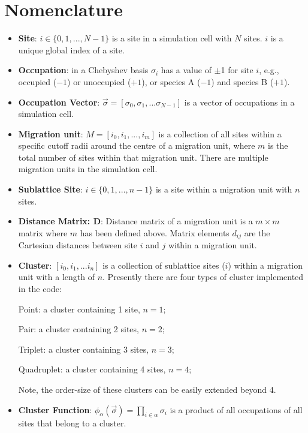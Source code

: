 \documentclass[a4paper,fleqn]{cas-dc}
\begin{document}
\section{Nomenclature}\label{sec:nomenclature}
\begin{itemize}
    \item \textbf{Site}: $i \in \{0,1,...,N-1\}$ is a site in a simulation cell with $N$ sites. $i$ is a unique global index of a site.

    \item \textbf{Occupation}: in a Chebyshev basis $\sigma_i$ has a value of $\pm$1  for site $i$, e.g., occupied ($-1$) or unoccupied ($+1$), or species A ($-1$) and species B ($+1$).

    \item \textbf{Occupation Vector}: $\vec{\sigma}=[ \sigma_0,\sigma_1,...\sigma_{N-1}]$ is a vector of occupations in a simulation cell.
    
    \item \textbf{Migration unit}: $M=[i_0,i_1,...,i_m]$ is a collection of all sites within a specific cutoff radii around the centre of a migration unit, where $m$ is the total number of sites within that migration unit. There are multiple migration units in the simulation cell.
    
    \item \textbf{Sublattice Site}: $i \in \{0,1,...,n-1\}$ is a site within a migration unit with $n$ sites.

    \item \textbf{Distance Matrix: D}: Distance matrix of a migration unit is a $m\times m$ matrix where $m$ has been defined above. Matrix elements $d_{ij}$ are the Cartesian distances between site $i$ and $j$ within a migration unit.

    \item \textbf{Cluster}: $[i_0,i_1,...i_{n}]$ is a collection of sublattice sites ($i$) within a migration unit with a length of $n$. Presently there are four types of cluster implemented in the code:

    Point: a cluster containing 1 site, $n=1$;
    
    Pair: a cluster containing 2 sites, $n=2$;
    
    Triplet: a cluster containing 3 sites, $n=3$;
    
    Quadruplet: a cluster containing 4 sites, $n=4$;
    
    Note, the order-size of these clusters can be easily extended beyond 4.
    \item \textbf{Cluster Function}: $\phi_{\alpha}(\vec{\sigma})=\prod_{i \in \alpha}\sigma_i$ is a product of all occupations of all sites that belong to a cluster.


\end{itemize}
\end{document}
